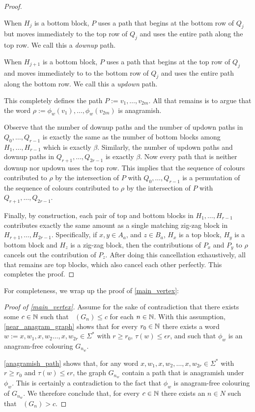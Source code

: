 \documentclass{patmorin}
\DeclareMathOperator{\afcn}{\dot{\chi}_\pi}
\begin{document}
\begin{proof}
    \begin{compactenum}
        \item When $H_j$ is a bottom block, $P$ uses a path that begins at the bottom row of $Q_j$ but moves immediately to the top row of $Q_j$ and uses the entire path along the top row. We call this a \emph{downup} path.
        \item When $H_{j+1}$ is a bottom block, $P$ uses a path that begins at the top row of $Q_j$ and moves immediately to to the bottom row of $Q_j$ and uses the entire path along the bottom row.  We call this a \emph{updown} path.
    \end{compactenum}
    This completely defines the path $P:=v_1,\ldots,v_{2m}$. All that remains is to argue that the word $\rho:=\phi_w(v_1),\ldots,\phi_w(v_{2m})$ is anagramish.

    Observe that the number of downup paths and the number of updown paths in $Q_0,\ldots,Q_{r-1}$ is exactly the same as the number of bottom blocks among $H_1,\ldots,H_{r-1}$ which is exactly $\beta$.  Similarly, the number of updown paths and downup paths in $Q_{r+1},\ldots,Q_{2r-1}$ is exactly $\beta$.  Now every path that is neither downup nor updown uses the top row.  This implies that the sequence of colours contributed to $\rho$ by  the intersection of $P$ with $Q_0,\ldots,Q_{r-1}$ is a permutation of the sequence of colours contributed to $\rho$ by the intersection of $P$ with $Q_{r+1},\ldots,Q_{2r-1}$.

    Finally, by construction, each pair of top and bottom blocks in $H_1,\ldots,H_{r-1}$ contributes exactly the same amount as a single matching zig-zag block in $H_{r+1},\ldots,H_{2r-1}$.  Specifically, if $x,y\in A_a$, and $z\in B_a$, $H_x$ is a top block, $H_y$ is a bottom block and $H_z$ is a zig-zag block, then the contributions of $P_x$ and $P_y$ to $\rho$ cancels out the contribution of $P_z$. After doing this cancellation exhaustively, all that remains are top blocks, which also cancel each other perfectly.  This completes the proof.
\end{proof}


For completeness, we wrap up the proof of \cref{main_vertex}:

\begin{proof}[Proof of \cref{main_vertex}]
    Assume for the sake of contradiction that there exists some $c\in\mathbb{N}$ such that $\afcn(G_n)\le c$ for each $n\in\mathbb{N}$.  With this assumption, \cref{near_anagram_graph} shows that for every $r_0\in\mathbb{N}$ there exists a word $w:=x,w_1,x,w_2\ldots,x,w_{2r}\in\Sigma^*$ with $r\ge r_0$, $\tau(w)\le\epsilon r$, and such that $\phi_w$ is an anagram-free colouring $G_{n_w}$.

    \cref{anagramish_path} shows that, for any word $x,w_1,x,w_2,\ldots,x,w_{2r}\in\Sigma^*$ with $r\ge r_0$ and $\tau(w)\le\epsilon r$, the graph $G_{n_w}$ contain a path that is anagramish under $\phi_w$.  This is certainly a contradiction to the fact that $\phi_w$ is anagram-free colouring of $G_{n_w}$. We therefore conclude that, for every $c\in\mathbb{N}$ there exists an $n\in N$ such that $\afcn(G_n)> c$.
\end{proof}
\end{document}
